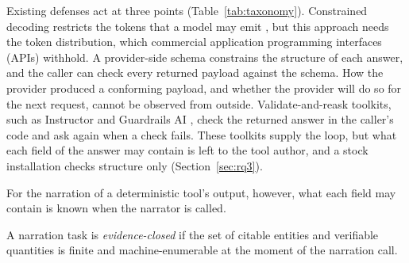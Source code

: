 \documentclass[smallextended,natbib]{svjour3}
\begin{document}
Existing defenses act at three points (Table~\ref{tab:taxonomy}). Constrained
decoding restricts the tokens that a model may
emit \citep{outlines,lmql,gcd,guidance,scholak2021picard}, but this approach
needs the token distribution, which commercial application programming
interfaces (APIs) withhold. A provider-side
schema \citep{structured} constrains the structure of each answer, and the
caller can check every returned payload against the schema. How the provider
produced a conforming payload, and whether the provider will do so for the
next request, cannot be observed from outside. Validate-and-reask toolkits,
such as Instructor \citep{liu2023instructor} and Guardrails
AI \citep{guardrailsai}, check the returned answer in the caller's code and ask
again when a check fails. These toolkits supply the loop, but what each field
of the answer may contain is left to the tool author, and a stock installation
checks structure only (Section~\ref{sec:rq3}).

For the narration of a deterministic tool's output, however, what each field
may contain is known when the narrator is called.

\begin{definition}\label{def:closed}
A narration task is \emph{evidence-closed} if the set of citable entities and
verifiable quantities is finite and machine-enumerable at the moment of the
narration call.
\end{definition}
\end{document}
